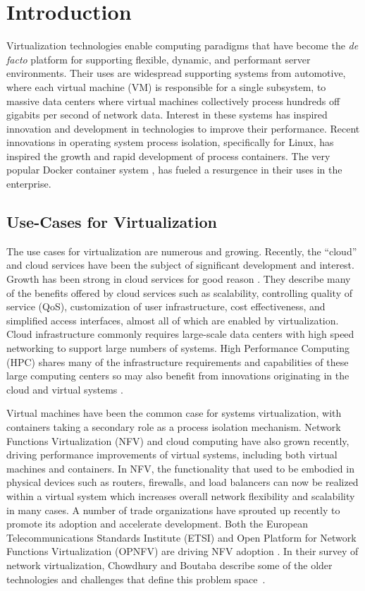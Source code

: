 \chapter{Introduction}
\label{sec:introduction}

Virtualization technologies enable computing paradigms that have become the \emph{de facto} platform for supporting flexible, dynamic, and performant server environments.  
Their uses are widespread supporting systems from automotive, where each virtual machine (VM) is responsible for a single subsystem, to massive data centers where virtual machines collectively process hundreds off gigabits per second of network data.
Interest in these systems has inspired innovation and development in technologies to improve their performance.
Recent innovations in operating system process isolation, specifically for Linux, has inspired the growth and rapid development of process containers.
The very popular Docker container system \autocite{dockerdotcom}, has fueled a resurgence in their uses in the enterprise.

\section{Use-Cases for Virtualization} %
\label{sec:introusecasesvt}
The use cases for virtualization are numerous and growing. 
Recently, the ``cloud'' and cloud services have been the subject of significant development and interest.
Growth has been strong in cloud services for good reason \autocite{_younge_1}.
They describe many of the benefits offered by cloud services such as scalability, controlling quality of service (QoS), customization of user infrastructure, cost effectiveness, and simplified access interfaces, almost all of which are enabled by virtualization.  
Cloud infrastructure commonly requires large-scale data centers with high speed networking to support large numbers of systems.  
High Performance Computing (HPC) shares many of the infrastructure requirements and capabilities of these large computing centers so may also benefit from innovations originating in the cloud and virtual systems \autocite{xavier2013performance, _younge_1}.

Virtual machines have been the common case for systems virtualization, with containers taking a secondary role as a process isolation mechanism.
Network Functions Virtualization (NFV) and cloud computing have also grown recently, driving performance improvements of virtual systems, including both virtual machines and containers.
In NFV, the functionality that used to be embodied in physical devices such as routers, firewalls, and load balancers can now be realized within a virtual system which increases overall network flexibility and scalability in many cases.
A number of trade organizations have sprouted up recently to promote its adoption and accelerate development.
Both the European Telecommunications Standards Institute (ETSI) and Open Platform for Network Functions Virtualization (OPNFV) \autocite{opnfv1} are driving NFV adoption \autocite{cohnopnfv}.
In their survey of network virtualization, Chowdhury and Boutaba describe some of the older technologies and challenges that define this problem space~\autocite{_chowdhury_1}.


